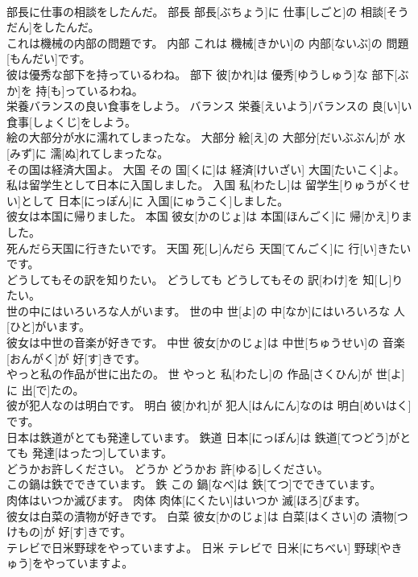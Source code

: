 \documentclass[8pt]{extreport}
\begin{document}
\begin{CJK}{UTF8}{min}
\\	部長に仕事の相談をしたんだ。	部長	部長[ぶちょう]に 仕事[しごと]の 相談[そうだん]をしたんだ。	
\\	これは機械の内部の問題です。	内部	これは 機械[きかい]の 内部[ないぶ]の 問題[もんだい]です。	
\\	彼は優秀な部下を持っているわね。	部下	彼[かれ]は 優秀[ゆうしゅう]な 部下[ぶか]を 持[も]っているわね。	
\\	栄養バランスの良い食事をしよう。	バランス	栄養[えいよう]バランスの 良[い]い 食事[しょくじ]をしよう。	
\\	絵の大部分が水に濡れてしまったな。	大部分	絵[え]の 大部分[だいぶぶん]が 水[みず]に 濡[ぬ]れてしまったな。	
\\	その国は経済大国よ。	大国	その 国[くに]は 経済[けいざい] 大国[たいこく]よ。	
\\	私は留学生として日本に入国しました。	入国	私[わたし]は 留学生[りゅうがくせい]として 日本[にっぽん]に 入国[にゅうこく]しました。	
\\	彼女は本国に帰りました。	本国	彼女[かのじょ]は 本国[ほんごく]に 帰[かえ]りました。	
\\	死んだら天国に行きたいです。	天国	死[し]んだら 天国[てんごく]に 行[い]きたいです。	
\\	どうしてもその訳を知りたい。	どうしても	どうしてもその 訳[わけ]を 知[し]りたい。	
\\	世の中にはいろいろな人がいます。	世の中	世[よ]の 中[なか]にはいろいろな 人[ひと]がいます。	
\\	彼女は中世の音楽が好きです。	中世	彼女[かのじょ]は 中世[ちゅうせい]の 音楽[おんがく]が 好[す]きです。	
\\	やっと私の作品が世に出たの。	世	やっと 私[わたし]の 作品[さくひん]が 世[よ]に 出[で]たの。	
\\	彼が犯人なのは明白です。	明白	彼[かれ]が 犯人[はんにん]なのは 明白[めいはく]です。	
\\	日本は鉄道がとても発達しています。	鉄道	日本[にっぽん]は 鉄道[てつどう]がとても 発達[はったつ]しています。	
\\	どうかお許しください。	どうか	どうかお 許[ゆる]しください。	
\\	この鍋は鉄でできています。	鉄	この 鍋[なべ]は 鉄[てつ]でできています。	
\\	肉体はいつか滅びます。	肉体	肉体[にくたい]はいつか 滅[ほろ]びます。	
\\	彼女は白菜の漬物が好きです。	白菜	彼女[かのじょ]は 白菜[はくさい]の 漬物[つけもの]が 好[す]きです。	
\\	テレビで日米野球をやっていますよ。	日米	テレビで 日米[にちべい] 野球[やきゅう]をやっていますよ。	

\end{CJK}
\end{document}
